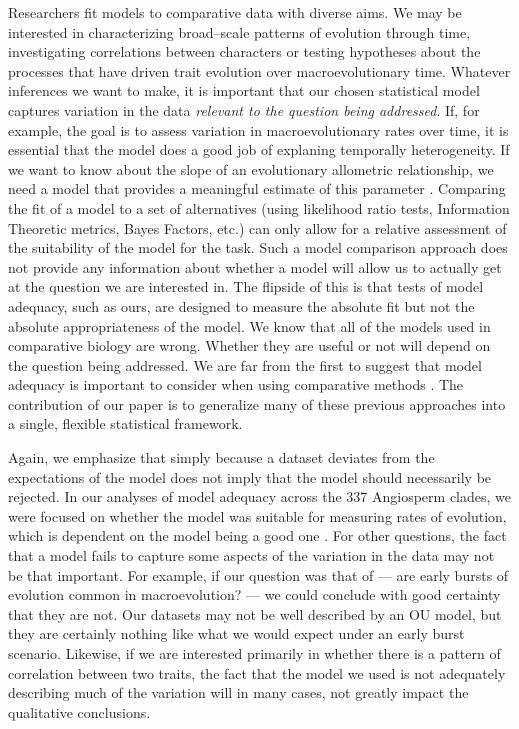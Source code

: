 \documentclass[a4paper,11pt]{article}
\begin{document}
Researchers fit models to comparative data with diverse aims. We may be interested in characterizing broad--scale patterns of evolution through time, investigating correlations between characters or testing hypotheses about the processes that have driven trait evolution over macroevolutionary time. Whatever inferences we want to make, it is important that our chosen statistical model captures variation in the data \emph{relevant to the question being addressed}. If, for example, the goal is to assess variation in macroevolutionary rates over time, it is essential that the model does a good job of explaning temporally heterogeneity. If we want to know about the slope of an evolutionary allometric relationship, we need a model that provides a meaningful estimate of this parameter \citep{Hansen2012}. Comparing the fit of a model to a set of alternatives (using likelihood ratio tests, Information Theoretic metrics, Bayes Factors, etc.) can only allow for a relative assessment of the suitability of the model for the task. Such a model comparison approach does not provide any information about whether a model will allow us to actually get at the question we are interested in. The flipside of this is that tests of model adequacy, such as ours, are designed to measure the absolute fit but not the absolute appropriateness of the model. We know that all of the models used in comparative biology are wrong. Whether they are useful or not will depend on the question being addressed. We are far from the first to suggest that model adequacy is important to consider when using comparative methods \citep[see, for example][]{Felsenstein1985, Felsenstein1988, HarveyPagel1991, Garland1992, Diaz1996, HansenMartins1996, Price1997, Garland1999, GarlandIves2000, HansenOrzack2005, Hansen2012, Felsenstein2012, Boettiger2012, SlaterPennell, Beaulieu2013, Blackmon2014}. The contribution of our paper is to generalize many of these previous approaches into a single, flexible statistical framework. 

Again, we emphasize that simply because a dataset deviates from the expectations of the model does not imply that the model should necessarily be rejected. In our analyses of model adequacy across the 337 Angiosperm clades, we were focused on whether the model was suitable for measuring rates of evolution, which is dependent on the model being a good one \citep{Hunt2012}. For other questions, the fact that a model fails to capture some aspects of the variation in the data may not be that important. For example, if our question was that of \citet{Harmon2010} --- are early bursts of evolution common in macroevolution? --- we could conclude with good certainty that they are not. Our datasets may not be well described by an OU model, but they are certainly nothing like what we would expect under an early burst scenario. Likewise, if we are interested primarily in whether there is a pattern of correlation between two traits, the fact that the model we used is not adequately describing much of the variation will in many cases, not greatly impact the qualitative conclusions.
\end{document}
